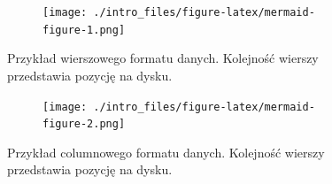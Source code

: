 \documentclass[
  letterpaper,
  DIV=11,
  numbers=noendperiod]{scrreprt}
\begin{document}
\begin{figure}

{\centering 

\begin{figure}[H]

{\centering \texttt{[image: ./intro\_files/figure-latex/mermaid-figure-1.png]}

}

\end{figure}

}

\caption{\label{fig-row}Przykład wierszowego formatu danych. Kolejność
wierszy przedstawia pozycję na dysku.}

\end{figure}

\begin{figure}

{\centering 

\begin{figure}[H]

{\centering \texttt{[image: ./intro\_files/figure-latex/mermaid-figure-2.png]}

}

\end{figure}

}

\caption{\label{fig-col}Przykład columnowego formatu danych. Kolejność
wierszy przedstawia pozycję na dysku.}

\end{figure}
\end{document}
